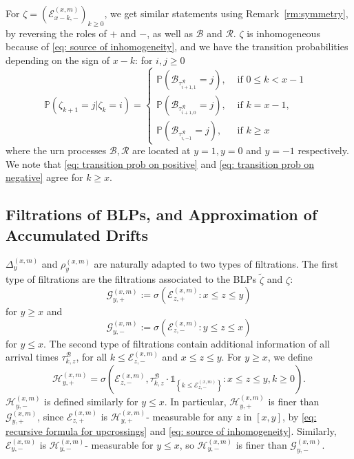 \documentclass[EJP]{ejpecp} %
\begin{document}
For $\zeta= \left(\mathcal{E}^{(x,m)}_{x-k,-} \right)_{k\geq 0}$, we get similar statements using Remark~\ref{rm:symmetry}, by reversing the roles of $+$ and $-$, as well as $\mathscr{B}$ and $\mathscr{R}$. $\zeta$ is inhomogeneous because of \eqref{eq: source of inhomogeneity}, and we have the transition probabilities depending on the sign of $x-k$: for $i,j\geq 0$
\begin{equation}\label{eq: transition prob on negative}
	\mathbb{P}\left(\zeta_{k+1}=j \vert \zeta_k =i  \right) = 
	\begin{cases}
		\mathbb{P}\left( \mathscr{B}_{\tau_{i+1,1}^{\mathscr{R}}} = j \right) ,& \mbox{ if $0 \leq k <  x-1$ }
		\\
		\mathbb{P}\left( \mathscr{B}_{\tau_{i+1,0}^{\mathscr{R}}} = j \right) ,& \mbox{ if $k =  x-1$, }
		\\
		\mathbb{P}\left( \mathscr{B}_{\tau_{i,-1}^{\mathscr{R}}} = j \right) ,& \mbox{ if $k \geq x$ }
	\end{cases}
\end{equation}
where the urn processes $\mathscr{B}, \mathscr{R}$ are located at $y = 1, y=0$ and $y = -1$ respectively. We note that \eqref{eq: transition prob on positive} and \eqref{eq: transition prob on negative} agree for $k \ge x$.


\subsection{Filtrations of BLPs, and Approximation of Accumulated Drifts}\label{subsec: measurability}

$\Delta^{(x,m)}_{y}$ and $\rho^{(x,m)}_{y}$ are naturally adapted to two types of filtrations. The first type of filtrations are the filtrations associated to the BLPs $\tilde{\zeta}$ and $\zeta$: 
$$\mathcal{G}_{y, +}^{(x,m)}:=\sigma\left(\mathcal{E}^{(x,m)}_{z, +}: x \le z \le y\right) $$ for $y \ge x$ and $$\mathcal{G}_{y, -}^{(x,m)}:=\sigma\left(\mathcal{E}^{(x,m)}_{z, -}: y \le z \le x\right) $$ for $y \le x$.
The second type of filtrations contain additional information of all arrival times $\tau^\mathscr{B}_{k,z}$, for all $k\leq \mathcal{E}^{(x,m)}_{z, -}$ and $x\leq z \leq y$.
For $y \ge x$, we define
\[
\mathcal{H}_{y, +}^{(x,m)} = \sigma\left( \mathcal{E}_{z, -}^{(x,m)}, \tau_{k, z}^\mathscr{B}\cdot \mathbb{1}_{\left\{ k\leq \mathcal{E}_{z, -}^{(x,m)} \right\}} : x \leq  z \leq y,  k \geq 0 \right) 
.\]
$\mathcal{H}_{y, -}^{(x,m)}$ is defined similarly for $y\leq x$.
In particular, $\mathcal{H}_{y, +}^{(x,m)}$ is finer than $\mathcal{G}_{y, +}^{(x,m)}$, since $\mathcal{E}_{z, +}^{(x,m)}$ is $\mathcal{H}_{y, +}^{(x,m)}$- measurable for any $z$ in $[x,y]$, by \eqref{eq: recursive formula for upcrossings} and \eqref{eq: source of inhomogeneity}. Similarly, $\mathcal{E}_{y, -}^{(x,m)}$ is $\mathcal{H}_{y, -}^{(x,m)}$- measurable for $ y\leq x$, so $\mathcal{H}_{y, -}^{(x,m)}$ is finer than $\mathcal{G}_{y, -}^{(x,m)}$. 
\end{document}
